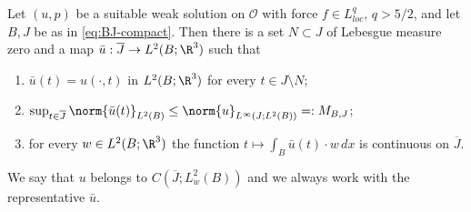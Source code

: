\documentclass[11pt,reqno]{amsart}
\begin{document}
\begin{lemma}\label{lem:weak-time-continuity}
Let $(u,p)$ be a suitable weak solution on $\mathcal{O}$ with force
$f\in L^{q}_{loc}$, $q>5/2$, and let $B,J$ be as in \eqref{eq:BJ-compact}. Then
there is a set $N\subset J$ of Lebesgue measure zero and a map
$\bar u:\overline{J}\to L^{2}(B;\R^{3})$ such that
\begin{enumerate}
\item[(i)] $\bar u(t)=u(\cdot,t)$ in $L^{2}(B;\R^{3})$ for every $t\in J\setminus N$;
\item[(ii)] $\sup_{t\in\overline{J}}\norm{\bar u(t)}_{L^{2}(B)}
  \le\norm{u}_{L^{\infty}(J;L^{2}(B))}=:M_{B,J}$;
\item[(iii)] for every $w\in L^{2}(B;\R^{3})$ the function
  $t\mapsto\int_{B}\bar u(t)\cdot w\,dx$ is continuous on $\overline{J}$.
\end{enumerate}
We say that $u$ belongs to $C(\overline{J};L^{2}_{w}(B))$ and we always work
with the representative $\bar u$.
\end{lemma}
\end{document}
